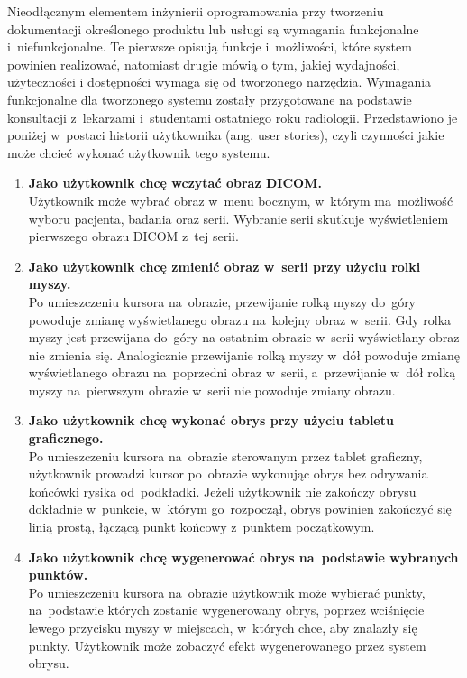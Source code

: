 \documentclass[a4paper,11pt,twoside,openright]{report}
\theoremstyle{definition}
\begin{document}
Nieodłącznym elementem inżynierii oprogramowania przy tworzeniu dokumentacji
określonego produktu lub usługi są wymagania funkcjonalne i~niefunkcjonalne.
Te pierwsze opisują funkcje i~możliwości, które system powinien realizować, natomiast
drugie mówią o tym, jakiej wydajności, użyteczności i dostępności wymaga się od tworzonego narzędzia.
Wymagania funkcjonalne dla tworzonego systemu zostały przygotowane na podstawie
konsultacji z~lekarzami i~studentami ostatniego roku radiologii. Przedstawiono
je poniżej w~postaci historii użytkownika (ang. user stories), czyli czynności
jakie może chcieć wykonać użytkownik tego systemu.
\begin{enumerate}
\item \textbf {Jako użytkownik chcę wczytać obraz DICOM.} \\
Użytkownik może wybrać obraz w~menu bocznym, w~którym ma~możliwość wyboru pacjenta,
badania oraz serii. Wybranie serii skutkuje wyświetleniem pierwszego obrazu DICOM z~tej serii.

\item \textbf {Jako użytkownik chcę zmienić obraz w~serii przy użyciu rolki myszy.} \\
Po umieszczeniu kursora na~obrazie, przewijanie rolką myszy do~góry powoduje zmianę
wyświetlanego obrazu na~kolejny obraz w~serii. Gdy rolka myszy jest przewijana do~góry
na ostatnim obrazie w~serii wyświetlany obraz nie zmienia się. Analogicznie
przewijanie rolką myszy w~dół powoduje zmianę wyświetlanego obrazu na~poprzedni
obraz w~serii, a~przewijanie w~dół rolką myszy na~pierwszym obrazie w~serii nie
powoduje zmiany obrazu.

\item \textbf {Jako użytkownik chcę wykonać obrys przy użyciu tabletu graficznego.} \\
Po umieszczeniu kursora na~obrazie sterowanym przez tablet graficzny, użytkownik
prowadzi kursor po~obrazie wykonując obrys bez odrywania końcówki rysika od~podkładki.
Jeżeli użytkownik nie zakończy obrysu dokładnie w~punkcie, w~którym go~rozpoczął,
obrys powinien zakończyć się linią prostą, łączącą punkt końcowy z~punktem początkowym.

\item \textbf {Jako użytkownik chcę wygenerować obrys na~podstawie wybranych punktów.} \\
Po umieszczeniu kursora na~obrazie użytkownik może wybierać punkty, na~podstawie
których zostanie wygenerowany obrys, poprzez wciśnięcie lewego przycisku myszy w
miejscach, w~których chce, aby znalazły się punkty. Użytkownik może zobaczyć efekt
wygenerowanego przez system obrysu.


\end{enumerate}
\end{document}
